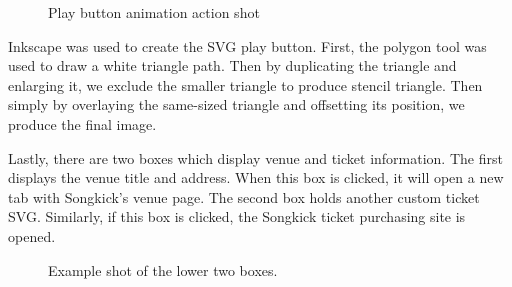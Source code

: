 \documentclass[10pt]{article}
\begin{document}
                \begin{figure}[!ht]
                  \centering
                  \caption{Play button animation action shot}
                \end{figure}

                Inkscape was used to create the SVG play button. First, the polygon tool was used to draw a white triangle path. Then by duplicating the triangle and enlarging it, we exclude the smaller triangle to produce stencil triangle. Then simply by overlaying the same-sized triangle and offsetting its position, we produce the final image.

                Lastly, there are two boxes which display venue and ticket information. The first displays the venue title and address. When this box is clicked, it will open a new tab with Songkick's venue page. The second box holds another custom ticket SVG. Similarly, if this box is clicked, the Songkick ticket purchasing site is opened.

                \begin{figure}[!ht]
                  \centering
                  \caption{Example shot of the lower two boxes.}
                \end{figure}
\end{document}
